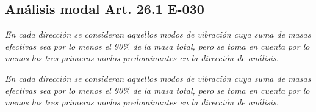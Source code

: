 \documentclass{article}%
\begin{document}
\subsection{Análisis modal Art. 26.1 E-030}%
\label{subsec:AnlisismodalArt.26.1E{-}030}%
\begin{tcolorbox}[colback=gray!5!white,colframe=Maroon!75!black,fonttitle=\bfseries,title=Art. 26.1.1]%
\textit{En cada dirección se consideran aquellos modos de vibración cuya suma de masas efectivas sea por lo menos el 90\% de la masa total, pero se toma en cuenta por lo menos los tres primeros modos predominantes en la dirección de análisis.}%
\end{tcolorbox}%
\begin{tcolorbox}[colback=gray!5!white,colframe=Maroon!75!black,fonttitle=\bfseries,title=Art. 26.1.2]%
\textit{En cada dirección se consideran aquellos modos de vibración cuya suma de masas efectivas sea por lo menos el 90\% de la masa total, pero se toma en cuenta por lo menos los tres primeros modos predominantes en la dirección de análisis.}%
\end{tcolorbox}%
\end{document}
